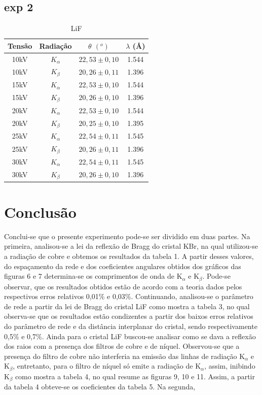 \documentclass[article,12pt,openright,oneside,a4paper,brazil]{abntex2}
\begin{document}
\subsection{exp 2}

\begin{table}[H]
    \centering
    \begin{tabular}{|c|c|c|c|}
        \hline
        Tensão & Radiação & $\theta$ $(^o)$ & $\lambda$ (\r{A}) \\ \hline
        10kV & $K_\alpha$ & $22,53\pm0,10$ & 1.544\\ \hline
        10kV & $K_\beta$ & $20,26\pm0,11$ & 1.396\\ \hline
        15kV & $K_\alpha$ & $22,53\pm0,10$ & 1.544\\ \hline
        15kV & $K_\beta$ & $20,26\pm0,10$ & 1.396\\ \hline
        20kV & $K_\alpha$ & $22,53\pm0,10$ & 1.544\\ \hline
        20kV & $K_\beta$ & $20,25\pm0,10$ & 1.395\\ \hline
        25kV & $K_\alpha$ & $22,54\pm0,11$ & 1.545\\ \hline
        25kV & $K_\beta$ & $20,26\pm0,11$ & 1.396\\ \hline
        30kV & $K_\alpha$ & $22,54\pm0,11$ & 1.545\\ \hline
        30kV & $K_\beta$ & $20,26\pm0,10$ & 1.396\\ \hline
    \end{tabular}
    \caption{LiF}
    \label{tab:my_label7}
\end{table}

\section{Conclusão}

Conclui-se que o presente experimento pode-se ser dividido em duas partes. Na primeira, analisou-se a lei da reflexão de Bragg do cristal KBr, na qual utilizou-se a radiação de cobre e obtemos os resultados da tabela 1. A partir desses valores, do espaçamento da rede e dos coeficientes angulares obtidos dos gráficos das figuras 6 e 7 determina-se os comprimentos de onda de K$_\alpha$ e K$_\beta$. Pode-se observar, que os resultados obtidos estão de acordo com a teoria dados pelos respectivos erros relativos 0,01\% e 0,03\%. Continuando, analisou-se o parâmetro de rede a partir da lei de Bragg do cristal LiF como mostra a tabela 3, no qual observa-se que os resultados estão condizentes a partir dos baixos erros relativos do parâmetro de rede e da distância interplanar do cristal, sendo respectivamente 0,5\% e 0,7\%. Ainda para o cristal LiF buscou-se analisar como se dava a reflexão dos raios com a presença dos filtros de cobre e de níquel. Observou-se que a presença do filtro de cobre não interferia na emissão das linhas de radiação K$_\alpha$ e K$_\beta$, entretanto, para o filtro de níquel só emite a radiação de K$_\alpha$, assim, inibindo K$_\beta$ como mostra a tabela 4, no qual resume as figuras 9, 10 e 11. Assim, a partir da tabela 4 obteve-se os coeficientes da tabela 5. Na segunda,    
\end{document}
